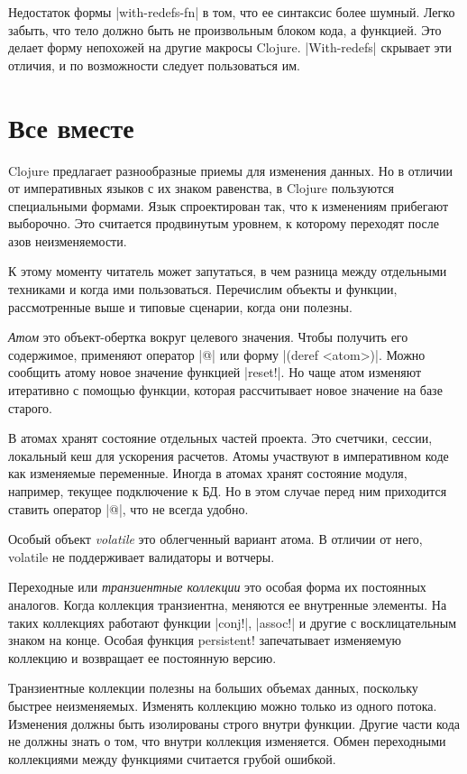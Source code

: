 Недостаток формы \spverb|with-redefs-fn| в том, что ее синтаксис более шумный. Легко
забыть, что тело должно быть не произвольным блоком кода, а функцией. Это делает
форму непохожей на другие макросы Clojure. \spverb|With-redefs| скрывает эти отличия, и
по возможности следует пользоваться им.

\section{Все вместе}

Clojure предлагает разнообразные приемы для изменения данных. Но в отличии от
императивных языков с их знаком равенства, в Clojure пользуются специальными
формами. Язык спроектирован так, что к изменениям прибегают выборочно. Это
считается продвинутым уровнем, к которому переходят после азов неизменяемости.

К этому моменту читатель может запутаться, в чем разница между отдельными
техниками и когда ими пользоваться. Перечислим объекты и функции, рассмотренные
выше и типовые сценарии, когда они полезны.

\emph{Атом} это объект-обертка вокруг целевого значения. Чтобы получить его
содержимое, применяют оператор \spverb|@| или форму \spverb|(deref <atom>)|. Можно сообщить
атому новое значение функцией \spverb|reset!|. Но чаще атом изменяют итеративно с
помощью функции, которая рассчитывает новое значение на базе старого.

В атомах хранят состояние отдельных частей проекта. Это счетчики, сессии,
локальный кеш для ускорения расчетов. Атомы участвуют в императивном коде как
изменяемые переменные. Иногда в атомах хранят состояние модуля, например,
текущее подключение к БД. Но в этом случае перед ним приходится ставить оператор
\spverb|@|, что не всегда удобно.

Особый объект \emph{volatile} это облегченный вариант атома. В отличии от него,
volatile не поддерживает валидаторы и вотчеры.

Переходные или \emph{транзиентные коллекции} это особая форма их постоянных
аналогов. Когда коллекция транзиентна, меняются ее внутренные элементы. На таких
коллекциях работают функции \spverb|conj!|, \spverb|assoc!| и другие с восклицательным знаком
на конце. Особая функция persistent! запечатывает изменяемую коллекцию и
возвращает ее постоянную версию.

Транзиентные коллекции полезны на больших объемах данных, поскольку быстрее
неизменяемых. Изменять коллекцию можно только из одного потока. Изменения должны
быть изолированы строго внутри функции. Другие части кода не должны знать о том,
что внутри коллекция изменяется. Обмен переходными коллекциями между функциями
считается грубой ошибкой.

